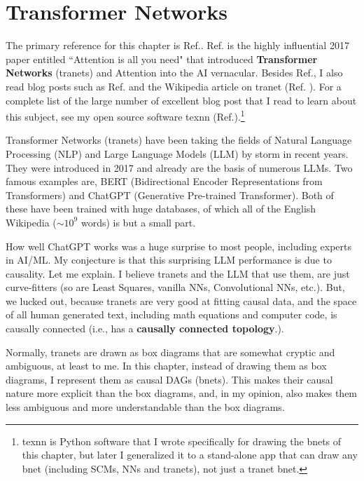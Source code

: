 \chapter{Transformer Networks}
\label{ch-transformer}

The primary reference for this chapter is  Ref.\cite{attention-is-all-you-need}.
Ref.\cite{attention-is-all-you-need} is  
 the highly influential  2017 paper entitled
``Attention is all you need" 
that introduced {\bf Transformer Networks} (tranets) and 
Attention into the AI vernacular.
Besides Ref.\cite{attention-is-all-you-need},
I also read blog posts
such as Ref.\cite{joshi-trans}
and the Wikipedia article on  tranet (Ref. \cite{wiki-transformer}).
For a complete list of the large number
of excellent blog post that I read to learn
about this subject, see my open source software texnn
(Ref.\cite{texnn}).\footnote{
texnn is
 Python software 
 that I wrote
specifically for drawing the bnets
of this chapter, but later I 
generalized it to a stand-alone app that can draw
any bnet (including SCMs, NNs and tranets), not just a tranet bnet.}

Transformer Networks (tranets)
have been taking the fields of
Natural Language Processing (NLP)
and Large Language Models (LLM)
by storm in recent years.
They were introduced in 2017 and already
are the basis of numerous LLMs.
Two famous examples are,
BERT (Bidirectional Encoder
Representations from Transformers)
and ChatGPT (Generative Pre-trained Transformer).
Both of these
have been trained with
huge databases,
of which all of
the English Wikipedia ($\sim 10^9$ words)
is but a small part.

How well ChatGPT works was a huge
surprise to most people, including experts in AI/ML.
My conjecture is that this surprising
LLM performance is
 due to causality.
 Let me explain. I believe tranets and the LLM that use them, are just curve-fitters (so are Least Squares, vanilla NNs, Convolutional NNs, etc.). But, we lucked out, because
tranets are very good at fitting causal data, and the space of all human generated text, including math
equations and computer code,
is causally connected (i.e., has
a {\bf causally connected topology}.).

Normally, tranets are
drawn as box diagrams
that are somewhat cryptic and ambiguous, at least to me.
In this chapter,
instead of 
drawing them as box diagrams,
I represent them as causal DAGs (bnets). This makes their
causal nature more explicit than 
the box diagrams, and,
in my opinion, also makes them
less ambiguous  and more understandable than the box diagrams.




